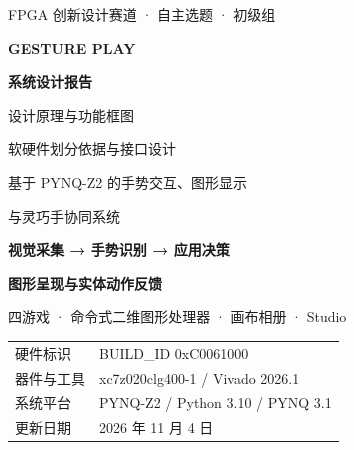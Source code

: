 \documentclass[UTF8,fontset=windows,a4paper,zihao=-4]{ctexart}
\begin{document}
\hypersetup{pageanchor=false}
\begin{titlepage}\color{ink}\vspace*{15mm}
{\large FPGA 创新设计赛道 · 自主选题 · 初级组\par}\vspace{15mm}
{\fontsize{32}{40}\selectfont\bfseries GESTURE PLAY\par}\vspace{3mm}
{\fontsize{25}{34}\selectfont\bfseries 系统设计报告\par}\vspace{8mm}
{\Large 设计原理与功能框图\par}\vspace{3mm}
{\Large 软硬件划分依据与接口设计\par}\vspace{10mm}
\noindent{\color{accent}\rule{\linewidth}{1.2pt}}\par\vspace{6mm}
{\large 基于 PYNQ-Z2 的手势交互、图形显示\par 与灵巧手协同系统\par}\vspace{12mm}
\noindent\colorbox{pale}{\parbox{\dimexpr\linewidth-2\fboxsep\relax}{\vspace{5mm}\centering
\textbf{视觉采集 → 手势识别 → 应用决策}\par
\textbf{图形呈现与实体动作反馈}\par\vspace{4mm}
四游戏 · 命令式二维图形处理器 · 画布相册 · Studio\par\vspace{5mm}}}
\vfill\noindent\begin{tabular}{@{}ll}
硬件标识 & BUILD\_ID 0xC0061000\\[4pt]
器件与工具 & xc7z020clg400-1 / Vivado 2026.1\\[4pt]
系统平台 & PYNQ-Z2 / Python 3.10 / PYNQ 3.1\\[4pt]
更新日期 & 2026 年 11 月 4 日
\end{tabular}\end{titlepage}
\hypersetup{pageanchor=true}\tableofcontents\clearpage
{}
\end{document}
